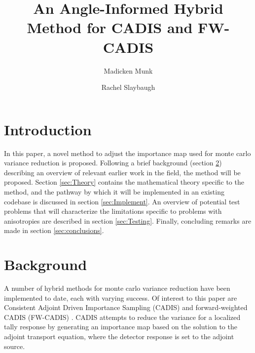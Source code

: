\documentclass{mc2015}
\begin{document}
\title{An Angle-Informed Hybrid Method for CADIS and FW-CADIS}

\author{Madicken Munk}
\author{Rachel Slaybaugh}

\maketitle

\section{Introduction}

In this paper, a novel method to adjust the importance map used for monte carlo variance reduction is proposed. Following a brief background (section \ref{sec:Background}) describing an overview of relevant earlier work in the field, the method will be proposed.  
Section \ref{sec:Theory} contains the mathematical theory specific to the method, and the pathway by which it will be implemented in an existing codebase is discussed in section \ref{sec:Implement}. 
An overview of potential test problems that will characterize the limitations specific to problems with anisotropies are described in section \ref{sec:Testing}. 
Finally, concluding remarks are made in section \ref{sec:conclusions}.  

\section{Background}
\label{sec:Background}

A number of hybrid methods for monte carlo variance reduction have been implemented to date, each with varying success. Of interest to this paper are Consistent Adjoint Driven Importance Sampling (CADIS) \cite{wagner_automatic_1997,wagner_automated_1998,haghighat_monte_2003} and forward-weighted CADIS (FW-CADIS) \cite{wagner_forward-weighted_2007,wagner_forward-weighted_2009,wagner_forward-weighted_2010}. CADIS attempts to reduce the variance for a localized tally response by generating an importance map based on the solution to the adjoint transport equation, where the detector response is set to the adjoint source. 
\end{document}
